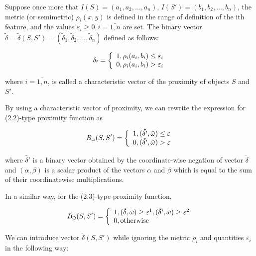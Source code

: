 Suppose once more that $I(S) = (a_1, a_2, \ldots, a_n)$,
$I(S') = (b_1, b_2, \ldots, b_n)$, the metric (or semimetric) $\rho_i(x, y)$
is defined in the range of definition of the ith feature, and the values $\varepsilon_i \geq 0, i = \bar{1, n}$ are set. 
The binary vector $\tilde{\delta} = \tilde{\delta}(S, S') = (\tilde{\delta}_1, \tilde{\delta}_2, \ldots, \tilde{\delta}_n)$ defined as follows: 

\begin{equation}
\delta_i = \left\{ 
  \begin{array}{l l}
    1, \rho_i(a_i,b_i) \leq \varepsilon_i \\
    0, \rho_i(a_i,b_i) > \varepsilon_i
  \end{array} \right.
\end{equation}

where $i = \bar{1,n}$, is called a characteristic vector of the proximity 
of objects $S$ and $S'$.

By using a characteristic vector of proximity, we can rewrite the expression for 
(2.2)-type proximity function as

\begin{equation}
B_{\tilde{\omega}}(S, S') = \left\{ 
  \begin{array}{l l}
    1, (\tilde{\delta'}, \tilde{\omega}) \leq \varepsilon \\
    0, (\tilde{\delta'}, \tilde{\omega}) > \varepsilon
  \end{array} \right.
\end{equation}

where $\tilde{\delta'}$ is a binary vector obtained by the coordinate-wise negation of vector 
$\tilde{\delta} $ and $(\alpha, \beta)$ is a scalar product of the vectors $\alpha$ and $\beta$ which is 
equal to the sum of their coordinatewise multiplications. 

In a similar way, for the (2.3)-type proximity function,

\begin{equation}
B_{\tilde{\omega}}(S, S') = \left\{ 
  \begin{array}{l l}
    1, (\tilde{\delta}, \tilde{\omega}) \geq \varepsilon^1, (\tilde{\delta'}, \tilde{\omega}) \geq \varepsilon^2 \\
    0, \text{otherwise}
  \end{array} \right.
\end{equation}

We can introduce vector $\tilde{\delta}(S, S')$ while ignoring the metric 
$\rho_i$ and quantities $\varepsilon_i$ in the following way:

